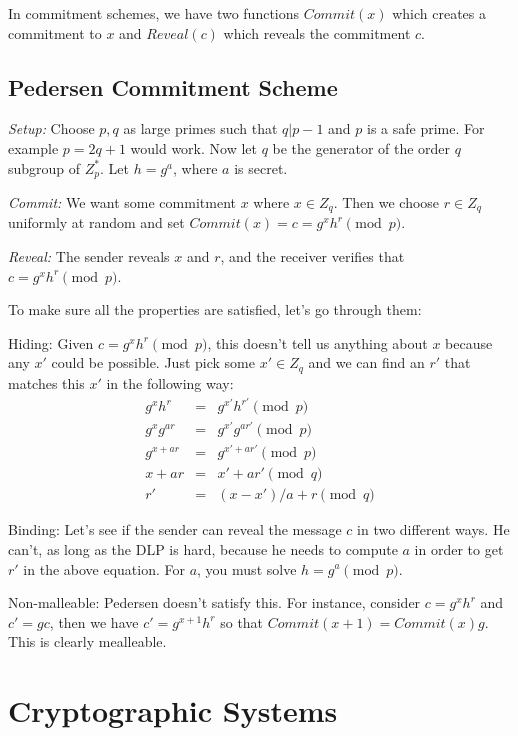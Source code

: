 \documentclass[psamsfonts]{amsart}
\begin{document}
In commitment schemes, we have two functions $Commit(x)$ which creates a commitment to $x$ and $Reveal(c)$ which reveals the commitment $c$.

\subsection{Pedersen Commitment Scheme}

\emph{Setup:} Choose $p,q$ as large primes such that $q | p-1$ and $p$ is a safe prime. For example $p = 2q +1$ would work. Now let $q$ be the generator of the order $q$ subgroup of $Z_p^*$. Let $h = g^a$, where $a$ is secret.

\emph{Commit:} We want some commitment $x$ where $x \in Z_q$. Then we choose $r \in Z_q$ uniformly at random and set $Commit(x) = c = g^x h^r \pmod{p}$.

\emph{Reveal:} The sender reveals $x$ and $r$, and the receiver verifies that $c = g^x h^r \pmod{p}$.

To make sure all the properties are satisfied, let's go through them:

Hiding: Given $c = g^x h^r \pmod{p}$, this doesn't tell us anything about $x$ because any $x'$ could be possible. Just pick some $x' \in Z_q$ and we can find an $r'$ that matches this $x'$ in the following way:
\begin{eqnarray}
  g^{x} h^r &=& g^{x'} h^{r'} \pmod{p} \\
  g^{x} g^{ar} &=& g^{x'} g^{ar'} \pmod{p} \\
    g^{x + ar} &=& g^{x' + ar'} \pmod{p} \\
        x + ar &=& x' + ar' \pmod{q} \\
            r' &=& (x-x')/a + r \pmod{q}
\end{eqnarray}

Binding: Let's see if the sender can reveal the message $c$ in two different ways. He can't, as long as the DLP is hard, because he needs to compute $a$ in order to get $r'$ in the above equation. For $a$, you must solve $h = g^a \pmod{p}$.

Non-malleable: Pedersen doesn't satisfy this. For instance, consider $c = g^x h^r$ and $c' = g c$, then we have $c' = g^{x+1} h^r$ so that $Commit(x+1) = Commit(x)g$. This is clearly mealleable.

\newpage

\section{Cryptographic Systems}
\end{document}
